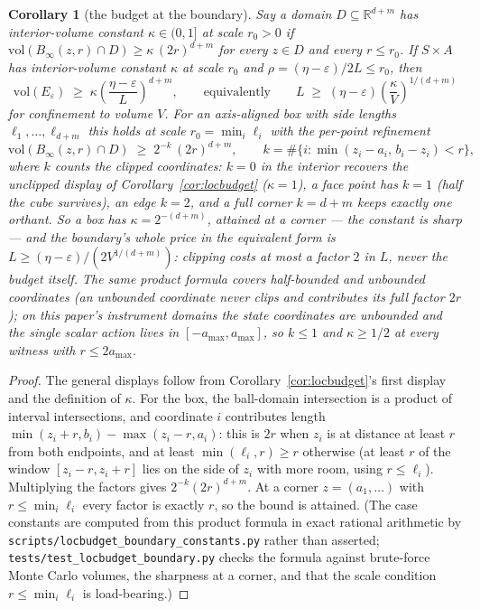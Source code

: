 \documentclass[11pt]{article}
\newtheorem{corollary}{Corollary}
\theoremstyle{definition}
\theoremstyle{remark}
\begin{document}
\begin{corollary}[the budget at the boundary]
\label{cor:kappabudget}
Say a domain $D \subseteq \mathbb{R}^{d+m}$ has \emph{interior-volume constant} $\kappa \in (0,1]$ at scale $r_0 > 0$ if $\mathrm{vol}(B_\infty(z,r) \cap D) \geq \kappa\,(2r)^{d+m}$ for every $z \in D$ and every $r \leq r_0$. If $S \times A$ has interior-volume constant $\kappa$ at scale $r_0$ and $\rho = (\eta-\varepsilon)/2L \leq r_0$, then
\[
  \mathrm{vol}(E_\varepsilon) \;\geq\; \kappa \left(\frac{\eta-\varepsilon}{L}\right)^{d+m},
  \qquad\text{equivalently}\qquad
  L \;\geq\; (\eta-\varepsilon)\left(\frac{\kappa}{V}\right)^{1/(d+m)}
\]
for confinement to volume $V$. For an axis-aligned box with side lengths $\ell_1,\dots,\ell_{d+m}$ this holds at scale $r_0 = \min_i \ell_i$ with the per-point refinement
\[
  \mathrm{vol}\!\left(B_\infty(z,r) \cap D\right) \;\geq\; 2^{-k}\,(2r)^{d+m}, \qquad k = \#\{i : \min(z_i - a_i,\, b_i - z_i) < r\},
\]
where $k$ counts the clipped coordinates: $k = 0$ in the interior recovers the unclipped display of Corollary~\ref{cor:locbudget} ($\kappa = 1$), a face point has $k = 1$ (half the cube survives), an edge $k = 2$, and a full corner $k = d+m$ keeps exactly one orthant. So a box has $\kappa = 2^{-(d+m)}$, attained at a corner --- the constant is sharp --- and the boundary's whole price in the equivalent form is $L \geq (\eta-\varepsilon)/(2V^{1/(d+m)})$: clipping costs at most a factor $2$ in $L$, never the budget itself. The same product formula covers half-bounded and unbounded coordinates (an unbounded coordinate never clips and contributes its full factor $2r$); on this paper's instrument domains the state coordinates are unbounded and the single scalar action lives in $[-a_{\max}, a_{\max}]$, so $k \leq 1$ and $\kappa \geq 1/2$ at every witness with $r \leq 2a_{\max}$.
\end{corollary}

\begin{proof}
The general displays follow from Corollary~\ref{cor:locbudget}'s first display and the definition of $\kappa$. For the box, the ball-domain intersection is a product of interval intersections, and coordinate $i$ contributes length $\min(z_i + r, b_i) - \max(z_i - r, a_i)$: this is $2r$ when $z_i$ is at distance at least $r$ from both endpoints, and at least $\min(\ell_i, r) \geq r$ otherwise (at least $r$ of the window $[z_i - r, z_i + r]$ lies on the side of $z_i$ with more room, using $r \leq \ell_i$). Multiplying the factors gives $2^{-k}(2r)^{d+m}$. At a corner $z = (a_1,\dots)$ with $r \leq \min_i \ell_i$ every factor is exactly $r$, so the bound is attained. (The case constants are computed from this product formula in exact rational arithmetic by \texttt{scripts/locbudget\_boundary\_constants.py} rather than asserted; \texttt{tests/test\_locbudget\_boundary.py} checks the formula against brute-force Monte Carlo volumes, the sharpness at a corner, and that the scale condition $r \leq \min_i \ell_i$ is load-bearing.)
\end{proof}
\end{document}
